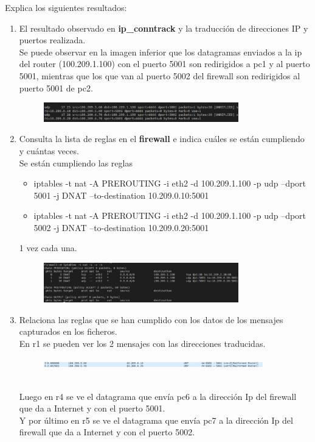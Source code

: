 \documentclass[12pt, a4paper]{report}
\begin{document}
Explica los siguientes resultados:
\begin{enumerate}
	\item El resultado observado en \textbf{ip\_conntrack }y la traducción de direcciones IP y puertos realizada.\\
	
	Se puede observar en la imagen inferior que los datagramas enviados a la ip del router (100.209.1.100) con el puerto 5001 son redirigidos a pc1 y al puerto 5001, mientras que los que van al puerto 5002 del firewall son redirigidos al puerto 5001 de pc2.
	\begin{figure}[h]
		\centering
		\includegraphics[width=0.8\textwidth]{ej2.2.2_1}
	\end{figure}
	\item Consulta la lista de reglas en el \textbf{firewall }e indica cuáles se están cumpliendo y cuántas veces.\\
	
	Se están cumpliendo las reglas
	\begin{center}
		\begin{itemize}
			\item iptables -t nat -A PREROUTING -i eth2 -d 100.209.1.100 -p udp --dport 5001 -j DNAT --to-destination 10.209.0.10:5001
			\item iptables -t nat -A PREROUTING -i eth2 -d 100.209.1.100 -p udp --dport 5002 -j DNAT --to-destination 10.209.0.20:5001
		\end{itemize}
	\end{center}
	1 vez cada una.
	\begin{figure}[h]
		\centering
		\includegraphics[width=0.8\textwidth]{ej2.2.2_2}
	\end{figure}
	\item Relaciona las reglas que se han cumplido con los datos de los mensajes capturados en los ficheros.\\
	
	En r1 se pueden ver los 2 mensajes con las direcciones traducidas.
	\begin{figure}[h]
		\centering
		\includegraphics[width=0.9\textwidth]{ej2.2.2_3}
	\end{figure}\\
	Luego en r4 se ve el datagrama que envía pc6 a la dirección Ip del firewall que da a Internet y con el puerto 5001.\\
	Y por último en r5 se ve el datagrama que envía pc7 a la dirección Ip del firewall que da a Internet y con el puerto 5002.
\end{enumerate}
\end{document}
